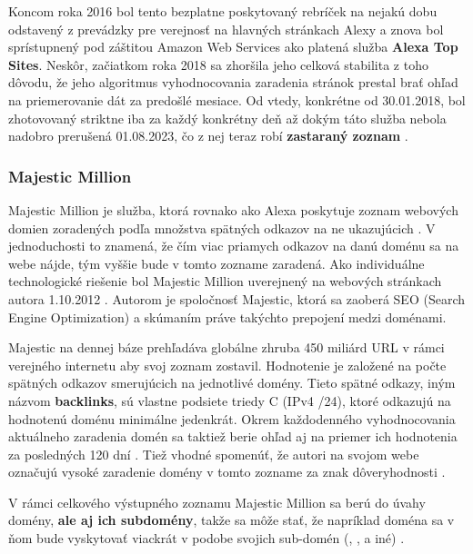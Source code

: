 Koncom roka 2016 bol tento bezplatne poskytovaný rebríček na nejakú dobu odstavený z prevádzky pre verejnosť na hlavných stránkach Alexy a znova bol sprístupnený pod záštitou Amazon Web Services ako platená služba \textbf{Alexa Top Sites}. 
Neskôr, začiatkom roka 2018 sa zhoršila jeho celková stabilita z toho dôvodu, že jeho algoritmus vyhodnocovania zaradenia stránok prestal brať ohľad na priemerovanie dát za predošlé mesiace.
Od vtedy, konkrétne od 30.01.2018, bol zhotovovaný striktne iba za každý konkrétny deň \cite{tranco} až dokým táto služba nebola nadobro prerušená 01.08.2023, čo z nej teraz robí \textbf{zastaraný zoznam} \cite{tranco-methodology}.

\subsubsection{Majestic Million}

Majestic Million je služba, ktorá rovnako ako Alexa poskytuje zoznam webových domien zoradených podľa množstva spätných odkazov na ne ukazujúcich \cite{majestic-million-homepage, majestic-million-ranking}.
V jednoduchosti to znamená, že čím viac priamych odkazov na danú doménu sa na webe nájde, tým vyššie bude v tomto zozname zaradená. 
Ako individuálne technologické riešenie bol Majestic Million uverejnený na webových stránkach autora 1.10.2012 \cite{majestic-million-publication}.
Autorom je spoločnosť Majestic, ktorá sa zaoberá SEO (Search Engine Optimization) a skúmaním práve takýchto prepojení medzi doménami.

Majestic na dennej báze prehľadáva globálne zhruba 450 miliárd URL v rámci verejného internetu aby svoj zoznam zostavil. 
Hodnotenie je založené na počte spätných odkazov smerujúcich na jednotlivé domény. Tieto spätné odkazy, iným názvom \textbf{backlinks}, sú vlastne podsiete triedy C (IPv4 /24), ktoré odkazujú
na hodnotenú doménu minimálne jedenkrát.
Okrem každodenného vyhodnocovania aktuálneho zaradenia domén sa taktiež berie ohľad aj na priemer ich hodnotenia za posledných 120 dní \cite{tranco-methodology}.
Tiež vhodné spomenúť, že autori na svojom webe označujú vysoké zaradenie domény v tomto zozname za znak dôveryhodnosti \cite{majestic-million-homepage}.

V rámci celkového výstupného zoznamu Majestic Million sa berú do úvahy domény, \textbf{ale aj ich subdomény}, takže sa môže stať, že napríklad doména  
sa v ňom bude vyskytovať viackrát v podobe svojich sub-domén (, ,  a iné) \cite{majestic-million-sub-domain-filtered}.

